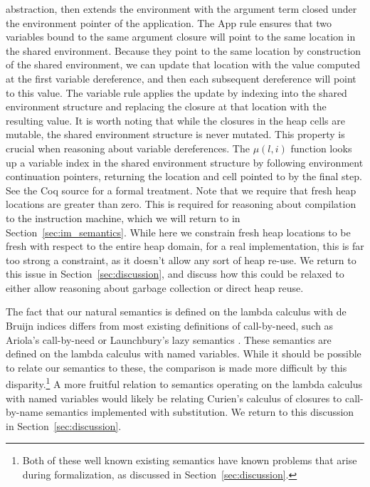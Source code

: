 abstraction, then extends the environment with the argument term closed under the
environment pointer of the application. The App rule ensures that two
variables bound to the same argument closure will point to the same location in
the shared environment. Because they point to the same location by construction
of the shared environment, we can update that location with the value computed
at the first variable dereference, and then each subsequent dereference will
point to this value. The variable rule applies the update by indexing into the
shared environment structure and replacing the closure at that location with the
resulting value. It is worth noting that while the closures in the heap cells
are mutable, the shared environment structure is never mutated. This property is
crucial when reasoning about variable dereferences. The $\mu\left(l, i\right)$
function looks up a variable index in the shared environment structure by
following environment continuation pointers, returning the location and cell
pointed to by the final step. See the Coq source
for a formal treatment. Note that we require that fresh heap locations are
greater than zero. This is required for reasoning about compilation to the
instruction machine, which we will return to in Section~\ref{sec:im_semantics}.
While here we constrain fresh heap locations to be fresh with respect to the
entire heap domain, for a real implementation, this is far too strong a
constraint, as it doesn't allow any sort of heap re-use. We return to this issue
in Section~\ref{sec:discussion}, and discuss how this could be relaxed to either
allow reasoning about garbage collection or direct heap reuse.

The fact that our natural semantics is defined on the lambda calculus with de Bruijn
indices differs from most existing definitions of call-by-need, such as
Ariola's call-by-need \cite{ariola1995call} or Launchbury's lazy semantics
\cite{launchburynatural}. These semantics are defined on the lambda calculus with named
variables. While it should be possible to relate our semantics to
these, the comparison is made more difficult by this disparity.\footnote{Both of
these well known existing semantics have known problems that arise during
formalization, as discussed in Section~\ref{sec:discussion}.} A more fruitful
relation to semantics operating on the lambda calculus with named variables
would likely be relating Curien's calculus of closures to call-by-name semantics
implemented with substitution. We return to this discussion in
Section~\ref{sec:discussion}.

